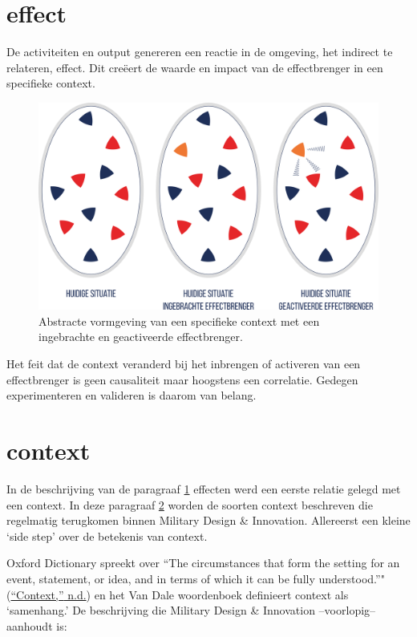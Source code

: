 \documentclass[
]{book}
\begin{document}
\hypertarget{effect}{%
\section{effect}\label{effect}}

De activiteiten en output genereren een reactie in de omgeving, het indirect te relateren, effect. Dit creëert de waarde en impact van de effectbrenger in een specifieke context.

\begin{figure}
\includegraphics[width=550pt]{data/images/20210324-MDI-eieren-huidig} \caption{Abstracte vormgeving van een specifieke context met een ingebrachte en geactiveerde effectbrenger.}\label{fig:effectbrenger-in-eieren}
\end{figure}

Het feit dat de context veranderd bij het inbrengen of activeren van een effectbrenger is geen causaliteit maar hoogstens een correlatie. Gedegen experimenteren en valideren is daarom van belang.

\hypertarget{context}{%
\section{context}\label{context}}

In de beschrijving van de paragraaf \ref{effect} effecten werd een eerste relatie gelegd met een context. In deze paragraaf \ref{context} worden de soorten context beschreven die regelmatig terugkomen binnen Military Design \& Innovation. Allereerst een kleine `side step' over de betekenis van context.

Oxford Dictionary spreekt over ``The circumstances that form the setting for an event, statement, or idea, and in terms of which it can be fully understood.''"(\protect\hyperlink{ref-context}{{``Context,''} n.d.}) en het Van Dale woordenboek definieert context als `samenhang.' De beschrijving die Military Design \& Innovation --voorlopig-- aanhoudt is:
\end{document}
